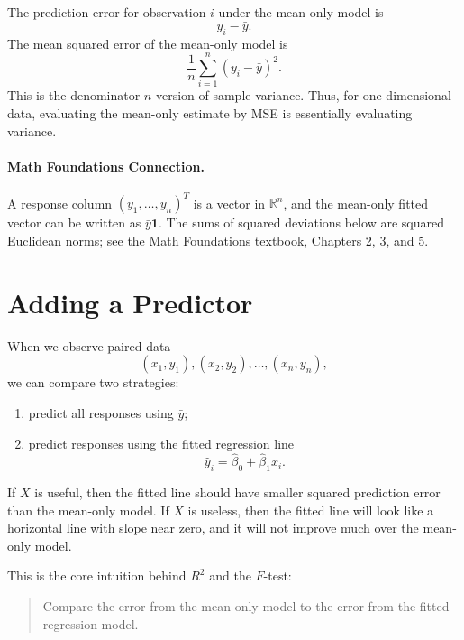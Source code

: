 The prediction error for observation $i$ under the mean-only model is
\begin{equation}
  y_i-\bar{y}.
\end{equation}
The mean squared error of the mean-only model is
\begin{equation}
  \frac{1}{n}\sum_{i=1}^n (y_i-\bar{y})^2.
\end{equation}
This is the denominator-$n$ version of sample variance.  Thus, for one-dimensional data, evaluating the mean-only estimate by MSE is essentially evaluating variance.

\paragraph{Math Foundations Connection.}
A response column $(y_1,\ldots,y_n)^T$ is a vector in $\mathbb{R}^n$, and the mean-only fitted vector can be written as $\bar{y}\mathbf{1}$.  The sums of squared deviations below are squared Euclidean norms; see the Math Foundations textbook, Chapters 2, 3, and 5.

\section{Adding a Predictor}

When we observe paired data
\begin{equation}
  (x_1,y_1),(x_2,y_2),\ldots,(x_n,y_n),
\end{equation}
we can compare two strategies:
\begin{enumerate}
  \item predict all responses using $\bar{y}$;
  \item predict responses using the fitted regression line
  \begin{equation}
    \widehat{y}_i=\widehat{\beta}_0+\widehat{\beta}_1x_i.
  \end{equation}
\end{enumerate}

If $X$ is useful, then the fitted line should have smaller squared prediction error than the mean-only model.  If $X$ is useless, then the fitted line will look like a horizontal line with slope near zero, and it will not improve much over the mean-only model.

This is the core intuition behind $R^2$ and the $F$-test:
\begin{quote}
  Compare the error from the mean-only model to the error from the fitted regression model.
\end{quote}

